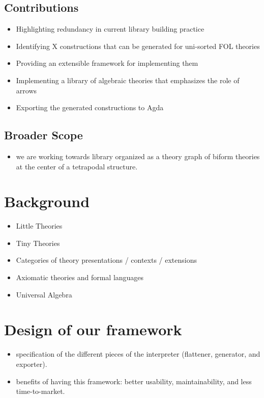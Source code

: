 \documentclass[]{article}
\begin{document}
\subsection{Contributions}
\begin{itemize}
    \item Highlighting redundancy in current library building practice 
    \item Identifying X constructions that can be generated for uni-sorted FOL theories 
    \item Providing an extensible framework for implementing them 
    \item Implementing a library of algebraic theories that emphasizes the role of arrows 
    \item Exporting the generated constructions to Agda 
\end{itemize}    

\subsection{Broader Scope}
\begin{itemize}
    \item we are working towards library organized as a theory graph of biform theories at the center of a tetrapodal structure.  
\end{itemize}

\section{Background}
\begin{itemize}
    \item Little Theories 
    \item Tiny Theories 
    \item Categories of theory presentations / contexts / extensions 
    \item Axiomatic theories and formal languages 
    \item Universal Algebra 
\end{itemize}
    
\section{Design of our framework}
\begin{itemize}
    \item specification of the different pieces of the interpreter (flattener, generator, and exporter). 
    \item benefits of having this framework: better usability, maintainability, and less time-to-market. 
\end{itemize}    
\end{document}
